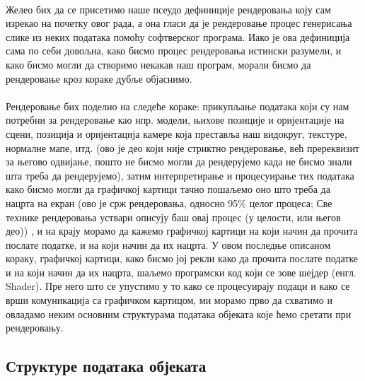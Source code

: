 \documentclass[12pt]{article}
\begin{document}
	\paragraph{}
	Желео бих да се присетимо наше псеудо дефиниције рендеровања коју сам изрекао на почетку овог рада, а она гласи да је рендеровање процес генерисања слике из неких података помоћу софтверског програма. Иако је ова дефиниција сама по себи довољна, како бисмо процес рендеровања истински разумели, и како бисмо могли да створимо некакав наш програм, морали бисмо да рендеровање кроз кораке дубље објаснимо.
	\paragraph{}
	Рендеровање бих поделио на следеће кораке: прикупљање података који су нам потребни за рендеровање као нпр. модели, њихове позиције и оријентације на сцени, позиција и оријентација камере која преставља наш видокруг, текстуре, нормалне мапе, итд. (ово је део који није стриктно рендеровање, већ пререквизит за његово одвијање, пошто не бисмо могли да рендерујемо када не бисмо знали шта треба да рендерујемо), затим интерпретирање и процесуирање тих података како бисмо могли да графичкој картици тачно пошаљемо оно што треба да нацрта на екран (ово је срж рендеровања, односно 95\% целог процеса; Све технике рендеровања уствари описују баш овај процес (у целости, или његов део)) ,  и на крају морамо да кажемо графичкој картици на који начин да прочита послате податке, и на који начин да их нацрта. У овом последње описаном кораку, графичкој картици, како бисмо јој рекли како да прочита послате податке и на који начин да их нацрта,  шаљемо програмски код који се зове шејдер (енгл. Shader). Пре него што се упустимо у то како се процесуирају подаци и како се врши комуникација са графичком картицом, ми морамо прво да схватимо и овладамо неким основним структурама података објеката које ћемо сретати при рендеровању.
	
	\subsection{Структуре података објеката}\label{strukturepodatakaproces}
\end{document}
